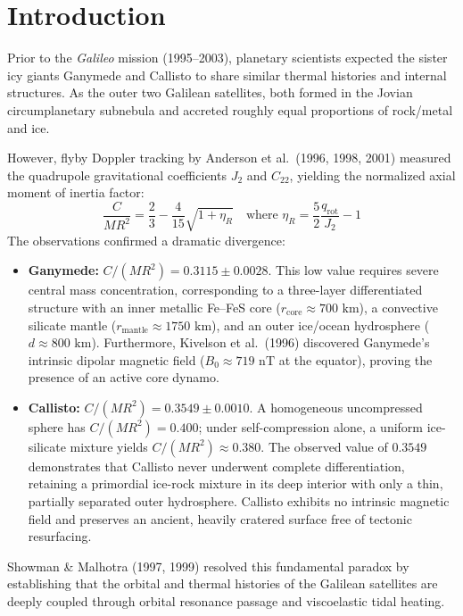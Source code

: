 \documentclass[11pt,a4paper]{article}
\begin{document}
\section{Introduction}
Prior to the \textit{Galileo} mission (1995--2003), planetary scientists expected the sister icy giants Ganymede and Callisto to share similar thermal histories and internal structures. As the outer two Galilean satellites, both formed in the Jovian circumplanetary subnebula and accreted roughly equal proportions of rock/metal and ice. 

However, flyby Doppler tracking by Anderson et al.\ (1996, 1998, 2001) measured the quadrupole gravitational coefficients $J_2$ and $C_{22}$, yielding the normalized axial moment of inertia factor:
\begin{equation}
\frac{C}{M R^2} = \frac{2}{3} - \frac{4}{15} \sqrt{1 + \eta_R} \quad \text{where } \eta_R = \frac{5}{2} \frac{q_{\text{rot}}}{J_2} - 1
\end{equation}
The observations confirmed a dramatic divergence:
\begin{itemize}
    \item \textbf{Ganymede:} $C/(M R^2) = 0.3115 \pm 0.0028$. This low value requires severe central mass concentration, corresponding to a three-layer differentiated structure with an inner metallic Fe--FeS core ($r_{\text{core}} \approx 700\text{ km}$), a convective silicate mantle ($r_{\text{mantle}} \approx 1750\text{ km}$), and an outer ice/ocean hydrosphere ($d \approx 800\text{ km}$). Furthermore, Kivelson et al.\ (1996) discovered Ganymede's intrinsic dipolar magnetic field ($B_0 \approx 719\text{ nT}$ at the equator), proving the presence of an active core dynamo.
    \item \textbf{Callisto:} $C/(M R^2) = 0.3549 \pm 0.0010$. A homogeneous uncompressed sphere has $C/(MR^2) = 0.400$; under self-compression alone, a uniform ice-silicate mixture yields $C/(MR^2) \approx 0.380$. The observed value of $0.3549$ demonstrates that Callisto never underwent complete differentiation, retaining a primordial ice-rock mixture in its deep interior with only a thin, partially separated outer hydrosphere. Callisto exhibits no intrinsic magnetic field and preserves an ancient, heavily cratered surface free of tectonic resurfacing.
\end{itemize}

Showman \& Malhotra (1997, 1999) resolved this fundamental paradox by establishing that the orbital and thermal histories of the Galilean satellites are deeply coupled through orbital resonance passage and viscoelastic tidal heating.
\end{document}
